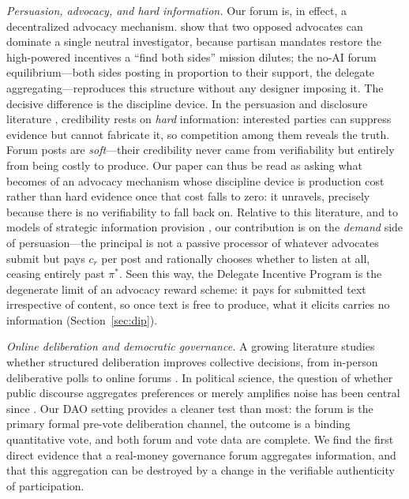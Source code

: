 \documentclass[12pt]{article}
\begin{document}
\emph{Persuasion, advocacy, and hard information.} Our forum is, in effect, a decentralized advocacy mechanism. \citet{dewatripont1999} show that two opposed advocates can dominate a single neutral investigator, because partisan mandates restore the high-powered incentives a ``find both sides'' mission dilutes; the no-AI forum equilibrium---both sides posting in proportion to their support, the delegate aggregating---reproduces this structure without any designer imposing it. The decisive difference is the discipline device. In the persuasion and disclosure literature \citep{milgrom1986, shin1998}, credibility rests on \emph{hard} information: interested parties can suppress evidence but cannot fabricate it, so competition among them reveals the truth. Forum posts are \emph{soft}---their credibility never came from verifiability but entirely from being costly to produce. Our paper can thus be read as asking what becomes of an advocacy mechanism whose discipline device is production cost rather than hard evidence once that cost falls to zero: it unravels, precisely because there is no verifiability to fall back on. Relative to this literature, and to models of strategic information provision \citep{chekartik2009, kamenica2011}, our contribution is on the \emph{demand} side of persuasion---the principal is not a passive processor of whatever advocates submit but pays $c_r$ per post and rationally chooses whether to listen at all, ceasing entirely past $\pi^*$. Seen this way, the Delegate Incentive Program is the degenerate limit of an advocacy reward scheme: it pays for submitted text irrespective of content, so once text is free to produce, what it elicits carries no information (Section~\ref{sec:dip}).

\emph{Online deliberation and democratic governance.} A growing literature studies whether structured deliberation improves collective decisions, from in-person deliberative polls \citep{luskin2002} to online forums \citep{wright2012}. In political science, the question of whether public discourse aggregates preferences or merely amplifies noise has been central since \citet{habermas1984}. Our DAO setting provides a cleaner test than most: the forum is the primary formal pre-vote deliberation channel, the outcome is a binding quantitative vote, and both forum and vote data are complete. We find the first direct evidence that a real-money governance forum aggregates information, and that this aggregation can be destroyed by a change in the verifiable authenticity of participation.
\end{document}

